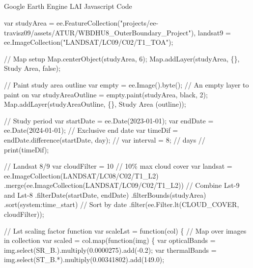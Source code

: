 \documentclass[
]{agujournal2019}
\makeatletter
\let\oldsubparagraph\subparagraph
\renewcommand{\subparagraph}{
    \@ifstar
      \xxxSubParagraphStar
      \xxxSubParagraphNoStar
  }
\newcommand{\xxxSubParagraphStar}[1]{\oldsubparagraph*{#1}\mbox{}}
\newcommand{\xxxSubParagraphNoStar}[1]{\oldsubparagraph{#1}\mbox{}}
\newenvironment{Shaded}{\begin{snugshade}}{\end{snugshade}}
\newcommand{\NormalTok}[1]{\textcolor[rgb]{0.00,0.23,0.31}{#1}}
\makeatother
\begin{document}
\subparagraph{Google Earth Engine LAI Javascript
Code}\label{google-earth-engine-lai-javascript-code}

\begin{Shaded}
\begin{Highlighting}[]
\NormalTok{var studyArea = ee.FeatureCollection("projects/ee{-}travisz09/assets/ATUR/WBDHU8\_OuterBoundary\_Project"),}
\NormalTok{    landsat9 = ee.ImageCollection("LANDSAT/LC09/C02/T1\_TOA");}

\NormalTok{// Map setup}
\NormalTok{Map.centerObject(studyArea, 6);}
\NormalTok{Map.addLayer(studyArea, \{\}, \textquotesingle{}Study Area\textquotesingle{}, false);}

\NormalTok{// Paint study area outline}
\NormalTok{var empty = ee.Image().byte();  // An empty layer to paint on}
\NormalTok{var studyAreaOutline = empty.paint(studyArea, \textquotesingle{}black\textquotesingle{}, 2);}
\NormalTok{Map.addLayer(studyAreaOutline, \{\}, \textquotesingle{}Study Area (outline)\textquotesingle{});}

\NormalTok{// Study period}
\NormalTok{var startDate = ee.Date(\textquotesingle{}2023{-}01{-}01\textquotesingle{});}
\NormalTok{var endDate = ee.Date(\textquotesingle{}2024{-}01{-}01\textquotesingle{});  // Exclusive end date}
\NormalTok{var timeDif = endDate.difference(startDate, \textquotesingle{}day\textquotesingle{});}
\NormalTok{// var interval = 8;  // days}
\NormalTok{// print(timeDif);}

\NormalTok{// Landsat 8/9}
\NormalTok{var cloudFilter = 10  // 10\% max cloud cover}
\NormalTok{var landsat = ee.ImageCollection(\textquotesingle{}LANDSAT/LC08/C02/T1\_L2\textquotesingle{})}
\NormalTok{  .merge(ee.ImageCollection(\textquotesingle{}LANDSAT/LC09/C02/T1\_L2\textquotesingle{}))  // Combine Lst{-}9 and Lst{-}8}
\NormalTok{  .filterDate(startDate, endDate)}
\NormalTok{  .filterBounds(studyArea)}
\NormalTok{  .sort(\textquotesingle{}system:time\_start\textquotesingle{})  // Sort by date}
\NormalTok{  .filter(ee.Filter.lt(\textquotesingle{}CLOUD\_COVER\textquotesingle{}, cloudFilter));}
  
\NormalTok{// Lst scaling factor function}
\NormalTok{var scaleLst = function(col) \{}
\NormalTok{  // Map over images in collection}
\NormalTok{  var scaled = col.map(function(img) \{}
\NormalTok{    var opticalBands = img.select(\textquotesingle{}SR\_B.\textquotesingle{}).multiply(0.0000275).add({-}0.2);}
\NormalTok{    var thermalBands = img.select(\textquotesingle{}ST\_B.*\textquotesingle{}).multiply(0.00341802).add(149.0);}
    

\end{Highlighting}
\end{Shaded}
\end{document}
